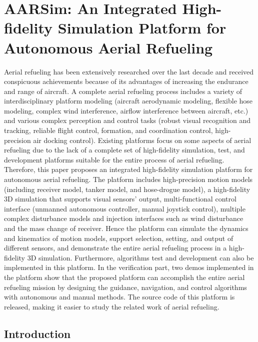 
\chapter{AARSim: An Integrated High-fidelity Simulation Platform for Autonomous Aerial Refueling}

Aerial refueling has been extensively researched over the last decade and received conspicuous achievements because of its advantages of increasing the endurance and range of aircraft. A complete aerial refueling process includes a variety of interdisciplinary platform modeling (aircraft aerodynamic modeling, flexible hose modeling, complex wind interference, airflow interference between aircraft, etc.) and various complex perception and control tasks (robust visual recognition and tracking, reliable flight control, formation, and coordination control, high-precision air docking control). Existing platforms focus on some aspects of aerial refueling due to the lack of a complete set of high-fidelity simulation, test, and development platforms suitable for the entire process of aerial refueling. Therefore, this paper proposes an integrated high-fidelity simulation platform for autonomous aerial refueling. The platform includes high-precision motion models (including receiver model, tanker model, and hose-drogue model), a high-fidelity 3D simulation that supports visual sensors' output, multi-functional control interface (unmanned autonomous controller, manual joystick control), multiple complex disturbance models and injection interfaces such as wind disturbance and the mass change of receiver. Hence the platform can simulate the dynamics and kinematics of motion models, support selection, setting, and output of different sensors, and demonstrate the entire aerial refueling process in a high-fidelity 3D simulation. Furthermore, algorithms test and development can also be implemented in this platform. In the verification part, two demos implemented in the platform show that the proposed platform can accomplish the entire aerial refueling mission by designing the guidance, navigation, and control algorithms with autonomous and manual methods. The source code of this platform is released, making it easier to study the related work of aerial refueling. 

\section{Introduction}
\label{sec1}

